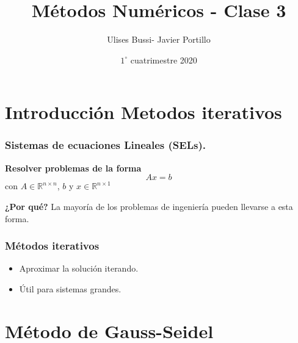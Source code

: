 \documentclass[xcolor=svgnames]{beamer} %
\title{Métodos Numéricos - Clase 3}
\author{Ulises Bussi- Javier Portillo}
\date{ $1^\circ$ cuatrimestre 2020}
\theoremstyle{plain}
\renewcommand{\textbf}[1]{{\bfseries\textcolor{redUnq2}{#1}}}
\theoremstyle{definition}
\begin{document}
 


\begin{frame} %
	\titlepage
\end{frame}

\begin{frame}
\tableofcontents
\end{frame}


\section{Introducción Metodos iterativos}

\begin{frame}
\frametitle{Sistemas de ecuaciones Lineales (SELs).}

\vspace{10pt}


\begin{tcolorbox}
\textbf{Resolver problemas de la forma}
$$A x = b $$
con $ A \in \mathbb{R}^{n\times n}$, $b$ y $x\in \mathbb{R}^{n\times 1}$
\end{tcolorbox} \vspace{20pt}

\textbf{¿Por qué?}
\pause
La mayoría de los problemas de ingeniería pueden llevarse a esta forma.


\end{frame}




\begin{frame}
\frametitle{Métodos iterativos}
\begin{itemize}
\item Aproximar la solución iterando.
\pause
\item Útil para sistemas grandes.

\end{itemize}
\end{frame}



\section{Método de Gauss-Seidel}
\end{document}
